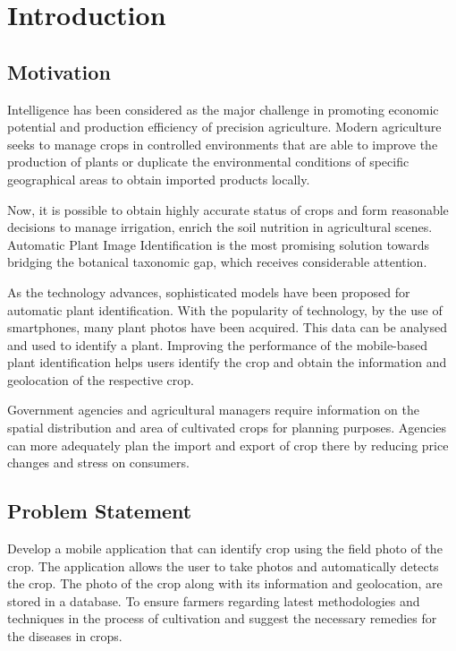 \documentclass[../Report.tex]{subfiles}
\begin{document}
\chapter{Introduction}

\section{Motivation}

Intelligence has been considered as the major challenge in promoting economic potential and production efficiency of precision
agriculture. Modern agriculture seeks to manage crops in controlled environments that are able to improve the production of plants or
duplicate the environmental conditions of specific geographical areas to obtain imported products locally.\par

Now, it is possible to obtain highly accurate status of crops and form reasonable decisions to manage irrigation, enrich the soil
nutrition in agricultural scenes. Automatic Plant Image Identification is the most promising solution towards bridging the botanical
taxonomic gap, which receives considerable attention.\par

As the technology advances, sophisticated models have been proposed for automatic plant identification. With the popularity of technology, 
by the use of smartphones, many plant photos have been acquired. This data can be analysed and used to identify a plant. Improving the 
performance of the mobile-based plant identification helps users identify the crop and obtain the information and geolocation of the 
respective crop.\par

Government agencies and agricultural managers require information on the spatial distribution and area of cultivated crops for planning 
purposes. Agencies can more adequately plan the import and export of crop there by reducing price changes and stress on consumers.

\section{Problem Statement}

Develop a mobile application that can identify crop using the field photo of the crop. The application allows the user to take photos 
and automatically detects the crop. The photo of the crop along with its information and geolocation, are stored in a database. To ensure 
farmers regarding latest methodologies and techniques in the process of cultivation and suggest the necessary remedies for the 
diseases in crops.\par
\end{document}
